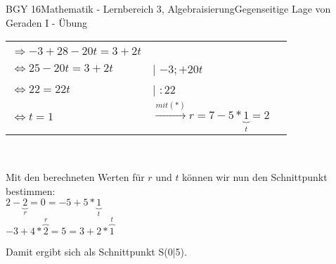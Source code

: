 \documentclass[oneside,openany,headings=optiontotoc,11pt,numbers=noenddot]{scrreprt}
\begin{document}
\begin{worksheet}{BGY 16}{Mathematik - Lernbereich 3, Algebraisierung}{Gegenseitige Lage von Geraden I - Übung}
\begin{framed}
\begin{tabular}{lll}
				\hline\\
				\(\Rightarrow -3+28-20t = 3+2t\)\\
				\(\Leftrightarrow 25-20t = 3+2t\) & | \(-3;+20t\)\\
				\(\Leftrightarrow 22 = 22t\) & | \(:22\)\\
				\(\Leftrightarrow t=1\) & \(\xrightarrow{mit (*)} r = 7 -5*\underbrace{1}_t = 2\)
			\end{tabular}\\
			\par\noindent
			Mit den berechneten Werten für \(r\) und \(t\) können wir nun den Schnittpunkt bestimmen:\\
			\(2-\underbrace{2}_{r} = 0 = -5+5*\underbrace{1}_{t}\)\\
			\(-3 +4*\overbrace{2}^r = 5 = 3+2*\overbrace{1}^t\)\\
			\par\noindent
			Damit ergibt sich als Schnittpunkt S(0|5).
		\end{framed}
	\end{worksheet}
\end{document}
